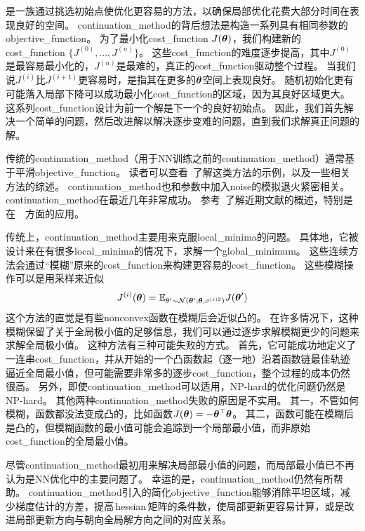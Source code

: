 是一族通过挑选初始点使优化更容易的方法，以确保局部优化花费大部分时间在表现良好的空间。
\gls{continuation_method}的背后想法是构造一系列具有相同参数的\gls{objective_function}。
为了最小化\gls{cost_function} $J(\boldsymbol{\theta})$，我们构建新的\gls{cost_function} $\{J^{(0)},\dots,J^{(n)}\}$。
这些\gls{cost_function}的难度逐步提高，其中$J^{(0)}$是最容易最小化的，$J^{(n)}$是最难的，真正的\gls{cost_function}驱动整个过程。
当我们说$J^{(i)}$比$J^{(i+1)}$更容易时，是指其在更多的$\boldsymbol{\theta}$空间上表现良好。
随机初始化更有可能落入局部下降可以成功最小化\gls{cost_function}的区域，因为其良好区域更大。
这系列\gls{cost_function}设计为前一个解是下一个的良好初始点。
因此，我们首先解决一个简单的问题，然后改进解以解决逐步变难的问题，直到我们求解真正问题的解。

传统的\gls{continuation_method}（用于\gls{NN}训练之前的\gls{continuation_method}）通常基于平滑\gls{objective_function}。
读者可以查看~\cite{Wu-97}了解这类方法的示例，以及一些相关方法的综述。
\gls{continuation_method}也和参数中加入\gls{noise}的模拟退火紧密相关\citep{Kirkpatrick83}。
\gls{continuation_method}在最近几年非常成功。
参考~\cite{Mobahi+Fisher-AAAI2015}了解近期文献的概述，特别是在~~方面的应用。


传统上，\gls{continuation_method}主要用来克服\gls{local_minima}的问题。
具体地，它被设计来在有很多\gls{local_minima}的情况下，求解一个\gls{global_minimum}。
这些连续方法会通过``模糊''原来的\gls{cost_function}来构建更容易的\gls{cost_function}。
这些模糊操作可以是用采样来近似
\begin{equation}
    J^{(i)}(\boldsymbol{\theta}) = \mathbb{E}_{\theta' \sim \mathcal{N}(\boldsymbol{\theta}'; \boldsymbol{\theta}, \sigma^{(i)2})} J(\boldsymbol{\theta}')
\end{equation}
这个方法的直觉是有些\gls{nonconvex}函数在模糊后会近似凸的。
在许多情况下，这种模糊保留了关于全局极小值的足够信息，我们可以通过逐步求解模糊更少的问题来求解全局极小值。
这种方法有三种可能失败的方式。
首先，它可能成功地定义了一连串\gls{cost_function}，并从开始的一个凸函数起（逐一地）沿着函数链最佳轨迹逼近全局最小值，但可能需要非常多的逐步\gls{cost_function}，整个过程的成本仍然很高。
另外，即使\gls{continuation_method}可以适用，NP-hard的优化问题仍然是NP-hard。
其他两种\gls{continuation_method}失败的原因是不实用。
其一，不管如何模糊，函数都没法变成凸的，比如函数$J(\boldsymbol{\theta}) = -\boldsymbol{\theta}^\top \boldsymbol{\theta}$。
其二，函数可能在模糊后是凸的，但模糊函数的最小值可能会追踪到一个局部最小值，而非原始\gls{cost_function}的全局最小值。


尽管\gls{continuation_method}最初用来解决局部最小值的问题，而局部最小值已不再认为是\gls{NN}优化中的主要问题了。
幸运的是，\gls{continuation_method}仍然有所帮助。
\gls{continuation_method}引入的简化\gls{objective_function}能够消除平坦区域，减少梯度估计的方差，提高\,\gls{hessian}\,矩阵的条件数，使局部更新更容易计算，或是改进局部更新方向与朝向全局解方向之间的对应关系。

